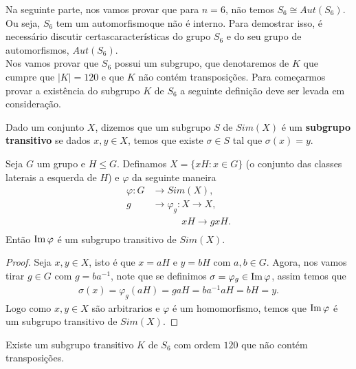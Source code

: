 Na seguinte parte, nos vamos provar que para $n=6$, não temos $S_6\cong Aut(S_6)$. Ou seja, $S_6$ tem um automorfismoque não é interno. Para demostrar isso, é necessário discutir certascaracterísticas do grupo $S_6$ e do seu grupo de automorfismos, $Aut(S_6)$.\\

Nos vamos provar que $S_6$ possui um subgrupo, que denotaremos de $K$ que cumpre que $|K|=120$ e que $K$ não contém transposições. Para começarmos  provar a existência do subgrupo $K$ de $S_6$ a seguinte definição deve ser levada em consideração.

\begin{definition}
  Dado um conjunto $X$, dizemos que um subgrupo $S$ de $Sim(X)$ é um \textbf{subgrupo transitivo} se dados $x,y\in X$, temos que existe $\sigma\in S$ tal que $\sigma(x)=y$. 
\end{definition}
\begin{lemma}\label{lema:1-S6-triste}
  Seja $G$ um grupo e $H\leq G$. Definamos $X=\{xH:x\in G\}$ (o conjunto das classes laterais a esquerda de $H$) e $\varphi$ da seguinte maneira
  \begin{align*}
    \varphi:G&\to Sim(X),\\
            g&\to \varphi_g:X\to X,\\
  \phantom{g}&\phantom{\to \varphi_g:}xH\to gxH.
  \end{align*}
  Então $\operatorname{Im} \varphi$ é um subgrupo transitivo de $Sim(X)$.
\end{lemma}
\begin{proof} 
  Seja $x,y\in X$, isto é que $x=aH$ e $y=bH$ com $a,b\in G$. Agora, nos vamos tirar $g\in G$ com $g=ba^{-1}$, note que se definimos $\sigma=\varphi_{g}\in\operatorname{Im}\varphi$, assim temos que
  \begin{align*}
    \sigma(x)=\varphi_{g}(aH)=gaH=ba^{-1}aH=bH=y.
  \end{align*}
  Logo como $x,y\in X$ são arbitrarios e $\varphi$ é um homomorfismo, temos que $\operatorname{Im}\varphi$ é um subgrupo transitivo de $Sim(X)$. 
\end{proof}
\begin{lemma}\label{lema:2-S6-triste}
  Existe um subgrupo transitivo $K$ de $S_6$ com ordem $120$ que não contém transposições. 
\end{lemma}
